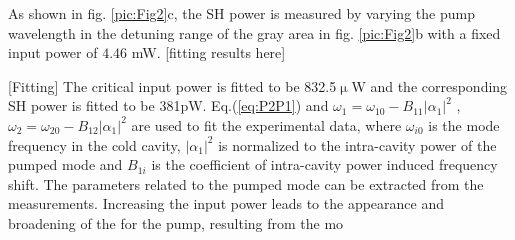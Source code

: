 \documentclass[a4paper,8pt,hyperref, twocolumn]{article}
\begin{document}


As shown in fig. \ref{pic:Fig2}c, the SH power is measured by varying the pump wavelength in the detuning range of the gray area in fig. \ref{pic:Fig2}b with a fixed input power of $4.46$ mW. [fitting results here]

[Fitting]
The critical input power is fitted to be 832.5$\upmu$W and the corresponding SH power is fitted to be 381pW. 
Eq.(\ref{eq:P2P1}) and $\omega_1 = \omega_{10}-B_{11}|\alpha_1|^2$ \cite{carmon2004dynamical}, $\omega_2 = \omega_{20}-B_{12}|\alpha_1|^2$ are used to fit the experimental data, where $\omega_{i0}$ is the mode frequency in the cold cavity, $|\alpha_1|^2$ is normalized to the intra-cavity power of the pumped mode and $B_{1i}$ is the coefficient of intra-cavity power induced frequency shift. The parameters related to the pumped mode can be extracted from the measurements. 
Increasing the input power leads to the appearance and broadening of the  for the pump\cite{carmon2004dynamical}, resulting from the mo 
\end{document}

